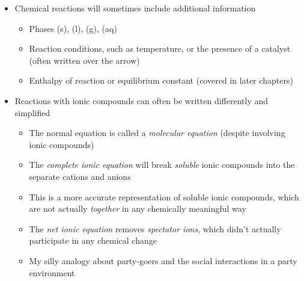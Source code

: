 \documentclass[12pt, openany, letterpaper]{memoir}
\begin{document}
\begin{itemize}
  ~\hphantom{Practice:} 

  Practice: Balance the following chemical equation: 

  ~\hphantom{Practice:} 

  Practice: Balance the following chemical equation: 

  ~\hphantom{Practice:} 
  \item Chemical reactions will sometimes include additional information
    \begin{itemize}
      \item Phases (s), (l), (g), (aq)
      \item Reaction conditions, such as temperature, or the presence of a catalyst (often written over the arrow)
      \item Enthalpy of reaction or equilibrium constant (covered in later chapters)
    \end{itemize}
  \item Reactions with ionic compounds can often be written differently and simplified
    \begin{itemize}
      \item The normal equation is called a \emph{molecular equation} (despite involving ionic compounds)

      \item The \emph{complete ionic equation} will break \emph{soluble} ionic compounds into the separate cations and anions
      \item This is a more accurate representation of soluble ionic compounds, which are not actually \emph{together} in any chemically meaningful way

      \item The \emph{net ionic equation} removes \emph{spectator ions}, which didn't actually participate in any chemical change
      \item My silly analogy about party-goers and the social interactions in a party environment

    \end{itemize}
\end{itemize}
\end{document}
